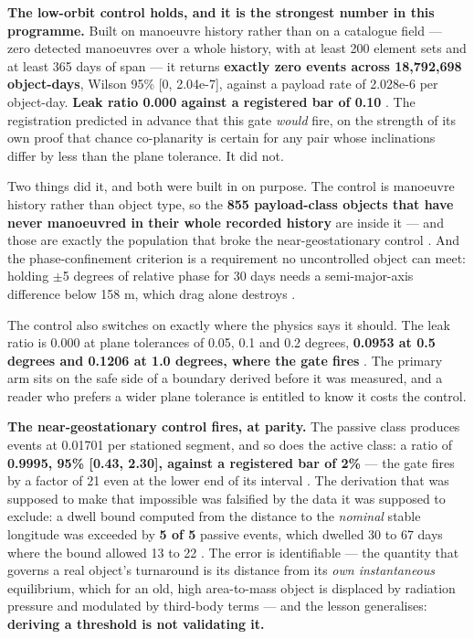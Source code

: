 \documentclass[11pt]{article}
\begin{document}
\textbf{The low-orbit control holds, and it is the strongest number in this programme.} Built on manoeuvre history rather than on a catalogue field --- zero detected manoeuvres over a whole history, with at least 200 element sets and at least 365 days of span --- it returns \textbf{exactly zero events across 18,792,698 object-days}, Wilson 95\% [0, 2.04e-7], against a payload rate of 2.028e-6 per object-day. \textbf{Leak ratio 0.000 against a registered bar of 0.10}%
. The registration predicted in advance that this gate \emph{would} fire, on the strength of its own proof that chance co-planarity is certain for any pair whose inclinations differ by less than the plane tolerance. It did not.

Two things did it, and both were built in on purpose. The control is manoeuvre history rather than object type, so the \textbf{855 payload-class objects that have never manoeuvred in their whole recorded history} are inside it --- and those are exactly the population that broke the near-geostationary control%
. And the phase-confinement criterion is a requirement no uncontrolled object can meet: holding $\pm$5 degrees of relative phase for 30 days needs a semi-major-axis difference below 158 m, which drag alone destroys%
.

The control also switches on exactly where the physics says it should. The leak ratio is 0.000 at plane tolerances of 0.05, 0.1 and 0.2 degrees, \textbf{0.0953 at 0.5 degrees and 0.1206 at 1.0 degrees, where the gate fires}%
. The primary arm sits on the safe side of a boundary derived before it was measured, and a reader who prefers a wider plane tolerance is entitled to know it costs the control.

\textbf{The near-geostationary control fires, at parity.} The passive class produces events at 0.01701 per stationed segment, and so does the active class: a ratio of \textbf{0.9995, 95\% [0.43, 2.30], against a registered bar of 2\%} --- the gate fires by a factor of 21 even at the lower end of its interval%
. The derivation that was supposed to make that impossible was falsified by the data it was supposed to exclude: a dwell bound computed from the distance to the \emph{nominal} stable longitude was exceeded by \textbf{5 of 5} passive events, which dwelled 30 to 67 days where the bound allowed 13 to 22%
. The error is identifiable --- the quantity that governs a real object's turnaround is its distance from its \emph{own instantaneous} equilibrium, which for an old, high area-to-mass object is displaced by radiation pressure and modulated by third-body terms --- and the lesson generalises: \textbf{deriving a threshold is not validating it.}
\end{document}
